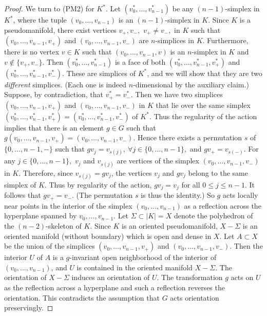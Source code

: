 \documentclass{amsart}
\theoremstyle{definition}
\theoremstyle{remark}
\begin{document}
\begin{proof}
We turn to (PM2) for $K^*$.
Let $(v^*_0, \ldots, v^*_{n-1})$ be any $(n-1)$-simplex in $K^*$,
where the tuple $(v_0, \ldots, v_{n-1})$ is an $(n-1)$-simplex in $K$.
Since $K$ is a pseudomanifold, there exist vertices $v_+,v_-,$ 
$v_+ \not= v_-,$ in $K$
such that
$(v_0, \ldots, v_{n-1}, v_+)$ and $(v_0, \ldots, v_{n-1}, v_-)$
are $n$-simplices in $K$.
Furthermore, there is no vertex $v\in K$ such that
$(v_0, \ldots, v_{n-1}, v)$ is
an $n$-simplex in $K$ and $v\not\in \{ v_+, v_- \}$.
Then $(v^*_0, \ldots, v^*_{n-1})$ is a face of both
$(v^*_0, \ldots, v^*_{n-1},v^*_+)$ and $(v^*_0, \ldots, v^*_{n-1},v^*_-)$.
These are simplices of $K^*$, and
we will show that they are two \emph{different} simplices. 
(Each one is indeed $n$-dimensional by the auxiliary claim.)
Suppose, by contradiction, that $v^*_+ = v^*_-$.
Then we have two simplices
$(v_0, \ldots, v_{n-1}, v_+)$ and $(v_0, \ldots, v_{n-1}, v_-)$
in $K$ that lie over the same simplex
$(v^*_0, \ldots, v^*_{n-1}, v^*_+) = (v^*_0, \ldots, v^*_{n-1}, v^*_-)$
of $K^*$. Thus the regularity of the action implies that there is
an element $g\in G$ such that
$g (v_0, \ldots, v_{n-1}, v_+) = (v_0, \ldots, v_{n-1}, v_-).$
Hence there exists a permutation $s$ of $\{ 0,\ldots, n-1,- \}$
such that
$g v_j = v_{s(j)},~ \forall j \in \{ 0,\ldots, n-1 \},$
and
$g v_+ = v_{s(-)}.$
For any $j \in \{ 0,\ldots, n-1 \},$
$v_j$ and $v_{s(j)}$ are vertices of the simplex
$(v_0, \ldots, v_{n-1}, v_-)$ in $K$. Therefore, since $v_{s(j)} = gv_j$,
the vertices $v_j$ and $gv_j$ belong to the same simplex of $K$. 
Thus by regularity of the action, $gv_j = v_j$ for all $0\leq j \leq n-1$.
It follows that $gv_+ = v_-$. (The permutation $s$ is thus the identity.)
So $g$ acts locally near points in the interior of the simplex
$(v_0, \ldots, v_{n-1})$ as a reflection across the hyperplane
spanned by $v_0, \ldots, v_{n-1}$.
Let $\Sigma \subset |K|=X$ denote the polyhedron of the 
$(n-2)$-skeleton of $K$. Since $K$ is an oriented pseudomanifold, 
$X-\Sigma$ is an oriented manifold (without boundary)
which is open and dense in $X$.
Let $A \subset X$ be the union of the simplices
$(v_0, \ldots, v_{n-1}, v_+)$ and $(v_0, \ldots, v_{n-1}, v_-)$.
Then the interior $U$ of $A$ is a $g$-invariant open neighborhood
of the interior of $(v_0, \ldots, v_{n-1})$, and $U$ is contained in
the oriented manifold $X-\Sigma$.
The orientation of $X-\Sigma$ induces an orientation of $U$.
The transformation $g$ acts on $U$ as the reflection across
a hyperplane and such a reflection reverses the orientation.
This contradicts the assumption that $G$ acts orientation preservingly.

\end{proof}
\end{document}
